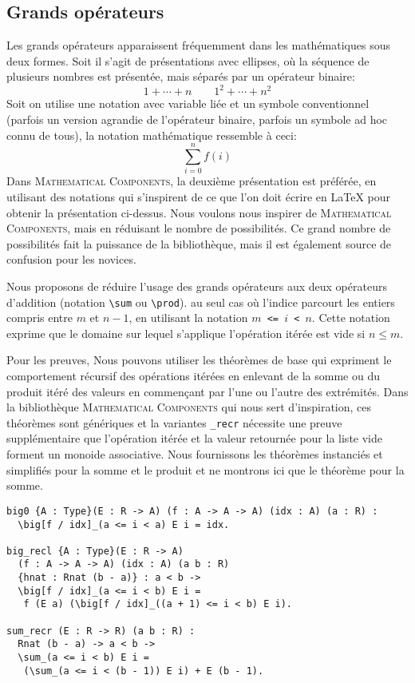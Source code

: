 \documentclass[draft]{jflart}
\newcommand{\cmd}[1]{\texttt{\textbackslash {#1}}}
\newcommand{\mathcomp}{\textsc{Mathematical Components}}
\begin{document}
\subsection{Grands opérateurs}
Les grands opérateurs apparaissent fréquemment dans les mathématiques
sous deux formes.  Soit il s'agit de présentations avec ellipses, où
la séquence de plusieurs nombres est présentée, mais séparés par un
opérateur binaire:
\[1 + \cdots + n  \qquad 1 ^ 2 + \cdots + n ^ 2 \]
Soit on utilise une notation avec variable liée et un symbole
conventionnel (parfois un version agrandie de l'opérateur binaire,
parfois un symbole ad hoc connu de tous), la notation mathématique
ressemble à ceci:
\[\sum_{i=0}^{n} f(i)\]
Dans \mathcomp{}, la deuxième présentation est préférée, en utilisant
des notations qui s'inspirent de ce que l'on doit écrire en \LaTeX{}
pour obtenir la présentation ci-dessus.  Nous voulons nous inspirer de
\mathcomp{}, mais en réduisant le nombre de possibilités.  Ce grand
nombre de possibilités fait la puissance de la bibliothèque, mais il
est également source de confusion pour les novices.

Nous proposons de réduire l'usage des grands opérateurs aux deux
opérateurs d'addition (notation \cmd{sum} ou \cmd{prod}).
au seul cas où
l'indice parcourt les entiers compris entre \({m}\) et \({n - 1}\),
en utilisant la notation \texttt{\(m\) <= \(i\) < \(n\)}.  Cette
notation exprime que le domaine sur lequel s'applique l'opération
itérée est vide si \(n \leq m\).

Pour les preuves, Nous pouvons utiliser les théorèmes de base qui
expriment le comportement récursif des opérations itérées
en enlevant de la somme ou du produit itéré des valeurs en commençant
par l'une ou l'autre des extrémités.  Dans la bibliothèque \mathcomp{}
qui nous sert d'inspiration, ces théorèmes sont génériques et la
variantes \texttt{\_recr} nécessite une preuve supplémentaire que
l'opération itérée et la valeur retournée pour la liste vide forment
 un monoide associative.  Nous fournissons les théorèmes
 instanciés et simplifiés pour la somme et le produit et ne montrons
 ici que le théorème pour la somme.
\begin{verbatim}
big0 {A : Type}(E : R -> A) (f : A -> A -> A) (idx : A) (a : R) :
  \big[f / idx]_(a <= i < a) E i = idx.

big_recl {A : Type}(E : R -> A)
  (f : A -> A -> A) (idx : A) (a b : R)
  {hnat : Rnat (b - a)} : a < b ->
  \big[f / idx]_(a <= i < b) E i =
   f (E a) (\big[f / idx]_((a + 1) <= i < b) E i).

sum_recr (E : R -> R) (a b : R) :
  Rnat (b - a) -> a < b ->
  \sum_(a <= i < b) E i =
   (\sum_(a <= i < (b - 1)) E i) + E (b - 1).
\end{verbatim}
\end{document}
